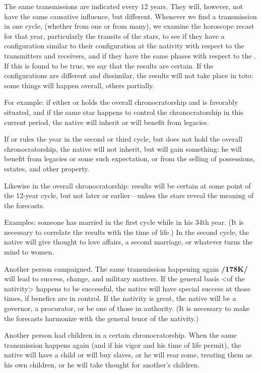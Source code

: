 The same transmissions are indicated every 12 years. They will, however, not have the same causative influence, but different. Whenever we find a transmission in one cycle, (whether from one or from many), we examine the horoscope recast for that year, particularly the transits of the stars, to see if they have a configuration similar to their configuration at the nativity with respect to the transmitters and receivers, and if they have the same phases with respect to the \Sun. If this is found to be true, we say that the results are certain. If the configurations are different and dissimilar, the results will not take place in toto: some things will happen overall, others partially. 

For example: if either \Jupiter\xspace or \Saturn\xspace holds the overall chronocratorship and is favorably situated, and if the same star happens to control the chronocratorship in this current period, the native will inherit or will benefit from legacies. 

If \Saturn\xspace or \Jupiter\xspace rules the year in the second or third cycle, but does not hold the overall chronocratorship, the native will not inherit, but will gain something: he will benefit from legacies or some such expectation, or from the selling of possessions, estates, and other property. 

Likewise in the overall chronocratorship: results will be certain at some point of the 12-year cycle, but not later or earlier—unless the stars reveal the meaning of the forecasts.

Examples: someone has married in the first cycle while in his 34th year. \mndl (It is necessary to correlate the results with the time of life.) In the second cycle, the native will give thought to love affairs, a second marriage, or whatever turns the mind to women.

Another person campaigned. The same transmission happening again \textbf{/178K/} will lead to success, change, and military matters. If the general basis <of the nativity> happens to be successful, the native will have special success at those times, if benefics are in control. If the nativity is great, the native will be a governor, a procurator, or be one of those in authority. \mndl (It is necessary to make the forecasts harmonize with the general tenor of the nativity.)

Another person had children in a certain chronocratorship. When the same transmission happens again (and if his vigor and his time of life permit), the native will have a child or will buy slaves, or he will rear some, treating them as his own children, or he will take thought for another’s children.

